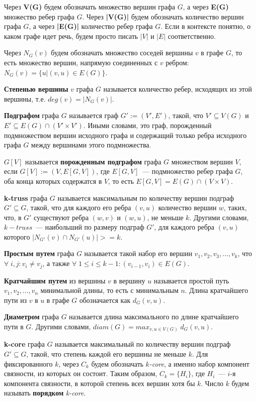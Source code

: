 Через \textbf{V(G)} будем обозначать множество вершин графа $G$, а через \textbf{E(G)} множество ребер графа $G$. Через \textbf{|V(G)|} будем обозначать количество вершин графа $G$, а через \textbf{|E(G)|} количество ребер графа $G$. Если в контексте понятно, о каком графе идет речь, будем просто писать $|V|$ и $|E|$ соответственно.

Через \textbf{$N_G(v)$} будем обозначать множество соседей вершины $v$ в графе $G$, то есть множество вершин, напрямую соединенных с $v$ ребром: $N_G(v) = \{u | (v, u) \in E(G)\}$.

\textbf{Степенью вершины} $v$ графа $G$ называется количество ребер, исходящих из этой вершины, т.е. $deg(v) = |N_G(v)|$.

\textbf{Подграфом} графа $G$ называется граф $G' := (V', E')$, такой, что $V' \subseteq V(G)$ и $E' \subseteq E(G) \cap (V' \times V')$. Иными словами, это граф, порожденный подмножеством вершин исходного графа и содержащий только ребра исходного графа $G$ между вершинами этого подмножества.

\textbf{$G[V]$} называется \textbf{порожденным подграфом} графа $G$ множеством вершин $V$, если $G[V] := (V, E[G, V])$, где $E[G, V]$~--- подмножество ребер графа $G$, оба конца которых содержатся в $V$, то есть $E[G, V] = E(G) \cap (V \times V)$.

\textbf{k-truss} графа $G$ называется максимальным по количеству вершин подграф $G' \subseteq G$, такой, что для каждого его ребра $(v, u)$ количество вершин $w$, таких, что, в $G'$ существуют ребра $(w, v)$ и $(w, u)$, не меньше $k$. Другими словами, $k-truss$~--- наибольший по размеру подграф $G'$, для каждого ребра $(v, u)$ которого $|N_{G'}(v) \cap N_{G'}(u)| >= k$.

\textbf{Простым путем} графа $G$ называется такой набор его вершин $v_1, v_2, v_3, \ldots, v_k$, что $\forall\; i, j: v_i \ne v_j$, а также $\forall\; 1 \le i \le k - 1: (v_{i-1}, v_i) \in E(G)$.

\textbf{Кратчайшим путем} из вершины $v$ в вершину $u$ называется простой путь $v_1, v_2, \ldots, v_n$ минимальной длины, то есть с минимальным $n$. Длина кратчайшего пути из $v$ в $u$ в графе $G$ обозначается как $d_G(v, u)$.

\textbf{Диаметром} графа $G$ называется длина максимального по длине кратчайшего пути в $G$. Другими словами, $diam(G) = max_{v, u \in V(G)}\; d_G(v, u)$.

\textbf{k-core} графа $G$ называется максимальный по количеству вершин подграф $G' \subseteq G$, такой, что степень каждой его вершины не меньше $k$. Для фиксированного $k$, через $C_k$ будем обозначать \textit{$k$-core}, а именно набор компонент связности, из которых он состоит. Таким образом, $C_k = \{H_i\}$, где $H_i$~--- $i$-я компонента связности, в которой степень всех вершин хотя бы $k$. Число $k$ будем называть \textbf{порядком} \textit{k-core}.


